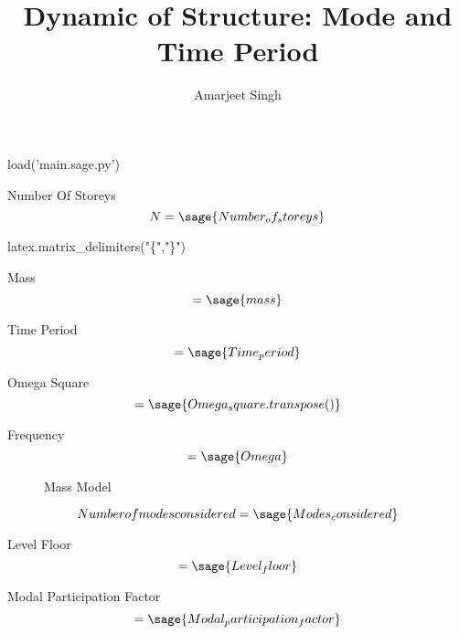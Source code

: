 \documentclass[12pt]{report}
\title{Dynamic of Structure: Mode and Time Period}
\author{Amarjeet Singh }
\begin{document}
\setcounter{chapter}{1}
\thispagestyle{plain}
	\begin{titlepage}
\maketitle
	\end{titlepage}

\begin{sagesilent}
	load('main.sage.py')

\end{sagesilent}

Number Of Storeys
\begin{equation}
	N = \sage{Number_of_storeys}
\end{equation}


\begin{sagesilent}
latex.matrix_delimiters("\{","\}")
\end{sagesilent}


Mass
\begin{equation}
	 [M]=\sage{mass}
\end{equation}



Time Period
\begin{equation}
	[T]=\sage{Time_period}
\end{equation}

Omega Square
\begin{equation}
	[\omega^2] =\sage{Omega_square.transpose()}
\end{equation}

Frequency
\begin{equation}
	[\omega]=\sage{Omega}
\end{equation}

\newpage
\begin{figure}
	\caption{Mass Model}
\end{figure}

\begin{equation}Number of modes considered=\sage{Modes_considered}
\end{equation}
\newpage

Level Floor
\begin{equation}
	[L]=\sage{Level_floor}
\end{equation}

Modal Participation Factor
\begin{equation}
	 [p]=\sage{Modal_participation_factor}
\end{equation}
\end{document}
